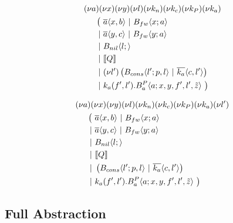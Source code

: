 \TODO{2cm}{}

\begin{align*}
  &\anew{a}{\anew{x}{\anew{y}{\anew{l}{\anew{k_n}{\anew{k_c}{\anew{k_P}{\anew{k_a}{ \\
    &\hspace{0.5cm}
    \begin{aligned}[t]
      \big(\ &\asnd{a}{x,b} \apar \ains{B_{fw}}{x}{a} \\
      \apar  &\asnd{a}{y,c} \apar \ains{B_{fw}}{y}{a} \\
      \apar  &\ains{B_{nil}}{l}{} \\
      \apar  &\encMJtoAP{Q} \\
      \apar  &\anew{l'}{\parens{\ains{B_{cons}}{l'}{p, l} \apar \asnd{k_a}{c, l'}}} \\
      \apar  &\arcv{k_a}{f',l'} . \ains{B_a^P}{a}{x, y, f', l',\tilde{z}}
      \ \big)
    \end{aligned}
  }}}}}}}}
\end{align*}

\TODO{2cm}{}

\begin{align*}
  &\anew{a}{\anew{x}{\anew{y}{\anew{l}{\anew{k_n}{\anew{k_c}{\anew{k_P}{\anew{k_a}{\anew{l'}{ \\
    &\hspace{0.5cm}
    \begin{aligned}[t]
      \big(\ &\asnd{a}{x,b} \apar \ains{B_{fw}}{x}{a} \\
      \apar  &\asnd{a}{y,c} \apar \ains{B_{fw}}{y}{a} \\
      \apar  &\ains{B_{nil}}{l}{} \\
      \apar  &\encMJtoAP{Q} \\
      \apar  &\parens{\ains{B_{cons}}{l'}{p, l} \apar \asnd{k_a}{c, l'}} \\
      \apar  &\arcv{k_a}{f',l'} . \ains{B_a^P}{a}{x, y, f', l',\tilde{z}}
      \ \big)
    \end{aligned}
  }}}}}}}}}
\end{align*}



\subsection{Full Abstraction}

